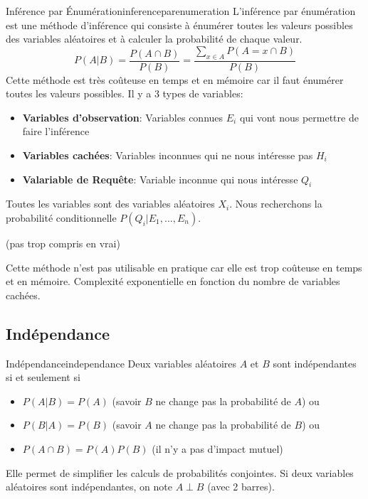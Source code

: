 \begin{definition}{Inférence par Énumération}{inferenceparenumeration}
    L'inférence par énumération est une méthode d'inférence qui consiste à énumérer toutes les valeurs possibles 
    des variables aléatoires et à calculer la probabilité de chaque valeur.
    \begin{equation}
        P(A|B) = \frac{P(A\cap B)}{P(B)} = \frac{\sum_{x \in A} P(A=x \cap B)}{P(B)}
    \end{equation} 
    Cette méthode est très coûteuse en temps et en mémoire car il faut énumérer toutes les valeurs possibles. 
    Il y a 3 types de variables:
    \begin{itemize}
        \item \textbf{Variables d'observation}: Variables connues $E_i$ qui vont nous permettre de faire l'inférence
        \item \textbf{Variables cachées}: Variables inconnues qui ne nous intéresse pas $H_i$ 
        \item \textbf{Valariable de Requête}: Variable inconnue qui nous intéresse $Q_i$
    \end{itemize}
    Toutes les variables sont des variables aléatoires $X_i$.
    Nous recherchons la probabilité conditionnelle $P(Q_i | E_1, ..., E_n)$.
\end{definition}

(pas trop compris en vrai)

\begin{remark}\leavevmode
    Cette méthode n'est pas utilisable en pratique car elle est trop coûteuse en temps et en mémoire. 
    Complexité exponentielle en fonction du nombre de variables cachées.
\end{remark}




\subsection{Indépendance} %
\label{sub:independance}


\begin{definition}{Indépendance}{independance}
    Deux variables aléatoires $A$ et $B$ sont indépendantes si et seulement si 
    \begin{itemize}[label=\textbullet]
        \item $P(A | B) = P(A)$  (savoir $B$ ne change pas la probabilité de $A$) ou
        \item $P(B | A) = P(B)$ (savoir $A$ ne change pas la probabilité de $B$) ou
        \item $P(A \cap B) = P(A)P(B)$ (il n'y a pas d'impact mutuel)
    \end{itemize}
    Elle permet de simplifier les calculs de probabilités conjointes.
    Si deux variables aléatoires sont indépendantes, on note $A \perp B$ (avec 2 barres).
\end{definition}

